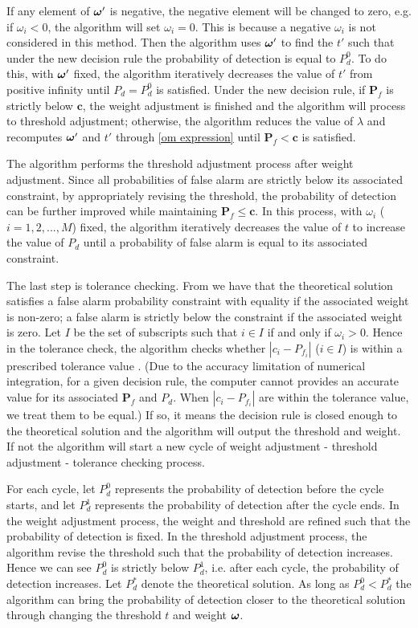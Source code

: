 If any element of $\boldsymbol{\omega}'$ is negative, the negative element will be changed to zero, e.g. if $\omega_i < 0$, the algorithm will set $\omega_i = 0$. This is because a negative  $\omega_i$ is not considered in this method.  
Then the algorithm uses $\boldsymbol{\omega}'$ to find the $t'$ such that under the new decision rule the probability of detection is equal to  $P_d^0$. To do this, with $\boldsymbol{\omega}'$ fixed, the algorithm iteratively decreases the value of $t'$ from positive infinity until $P_d = P_d^0$ is satisfied. Under the new decision rule, if $\mathbf{P}_f$ is strictly below $\mathbf{c}$, the weight adjustment is finished and the algorithm will process to  threshold adjustment; otherwise, the algorithm reduces the value of $\lambda$ and recomputes $\boldsymbol{\omega}'$ and $t'$ through \eqref{om expression} until $\mathbf{P}_f < \mathbf{c}$  is satisfied. 

 The algorithm performs the threshold adjustment process after weight adjustment. Since all probabilities of false alarm are strictly below its associated constraint, by appropriately revising the threshold, the probability of detection can be further improved while maintaining $\mathbf{P}_f \leq \mathbf{c}$. In this process, with $\omega_i$ ($i=1, 2, ..., M$) fixed, the algorithm iteratively decreases the value of $t$ to increase the value of $P_d$ until a probability of false alarm is equal to its associated constraint.  

The last step is tolerance checking. From \cite{zhang2000efficient} we have that the theoretical solution satisfies a false alarm probability constraint with equality if the associated weight is non-zero; a false alarm is strictly below the constraint if the associated weight is zero. 
Let $I$ be the set of subscripts such that $i \in I$ if and only if $\omega_i > 0$. 
Hence in the tolerance check, the algorithm checks whether $|c_i - P_{f_i}|$ ($i \in I$) is within a prescribed tolerance value . 
(Due to the accuracy limitation of numerical integration, for a given decision rule, the computer cannot provides an accurate value for its associated $\mathbf{P}_f$ and $P_d$. When $|c_i - P_{f_i}|$ are within the tolerance value, we treat them to be equal.) 
If so, it means the decision rule is closed enough to the theoretical solution and the algorithm will output the threshold and weight.  If not the algorithm will start a new cycle of weight adjustment - threshold adjustment - tolerance checking process. 

For each cycle, let $P_d^0$ represents the probability of detection before the cycle starts, and let $P_d^1$ represents the probability of detection after the cycle ends. In the weight adjustment process, the weight and threshold are refined such that the probability of detection is fixed. In the threshold adjustment process, the algorithm revise the threshold such that the probability of detection increases. Hence we can see $P_d^0$ is strictly below $P_d^1$, i.e. after each cycle, the probability of detection increases. Let $P_d^\ast$ denote the theoretical solution. As long as $P_d^0 < P_d^\ast$  the algorithm can bring the probability of detection closer to the theoretical solution  through changing the threshold $t$ and weight $\boldsymbol{\omega}$.

